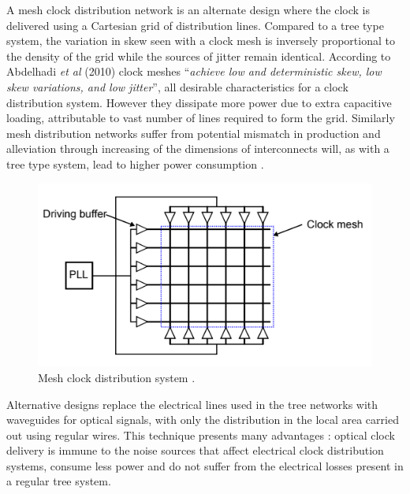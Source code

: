 A mesh clock distribution network is an alternate design where the clock is delivered using a Cartesian grid of distribution lines. Compared to a tree type system, the variation in skew seen with a clock mesh is inversely proportional to the density of the grid while the sources of jitter remain identical. According to Abdelhadi \textit{et al} (2010) clock meshes ``\textit{achieve low and deterministic skew, low skew variations, and low jitter}'', all desirable characteristics for a clock distribution system. However they dissipate more power due to extra capacitive loading, attributable to vast number of lines required to form the grid. Similarly mesh distribution networks suffer from potential mismatch in production and alleviation through increasing of the dimensions of interconnects will, as with a tree type system, lead to higher power consumption \cite{abdelhadi2010timing}. 
\begin{figure}[h]
	\centering
	\includegraphics[scale=0.7]{../tex_files/eldar_mesh}
	\caption[Mesh clock distribution system ]{Mesh clock distribution system \cite{zianbetov2013phd}.}
	\label{fig:mesh}
\end{figure}
Alternative designs replace the electrical lines used in the tree networks with waveguides for optical signals, with only the distribution in the local area carried out using regular wires. This technique presents many advantages \cite{chen2006chip}: optical clock delivery is immune to the noise sources that affect electrical clock distribution systems, consume less power and do not suffer from the electrical losses present in a regular tree system.

